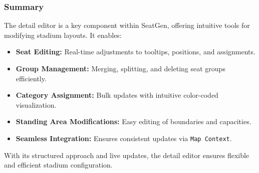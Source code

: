 \subsubsection{Summary}
The detail editor is a key component within SeatGen, offering intuitive tools for modifying stadium layouts. It enables:
\begin{itemize}
    \item \textbf{Seat Editing:} Real-time adjustments to tooltips, positions, and assignments.
    \item \textbf{Group Management:} Merging, splitting, and deleting seat groups efficiently.
    \item \textbf{Category Assignment:} Bulk updates with intuitive color-coded visualization.
    \item \textbf{Standing Area Modifications:} Easy editing of boundaries and capacities.
    \item \textbf{Seamless Integration:} Ensures consistent updates via \texttt{Map Context}.
\end{itemize}

With its structured approach and live updates, the detail editor ensures flexible and efficient stadium configuration.
